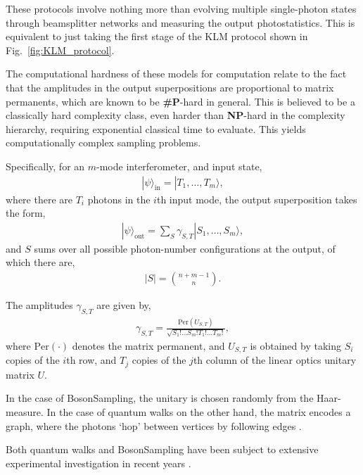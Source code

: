 \documentclass[aps,rmp,twocolumn,amsmath,amssymb,nofootinbib,superscriptaddress,longbibliography,floatfix]{revtex4-1}
\newcommand{\ket}[1]{|#1\rangle}
\begin{document}
These protocols involve nothing more than evolving multiple single-photon states through beamsplitter networks and measuring the output photostatistics. This is equivalent to just taking the first stage of the KLM protocol shown in Fig.~\ref{fig:KLM_protocol}.

The computational hardness of these models for computation relate to the fact that the amplitudes in the output superpositions are proportional to matrix permanents, which are known to be \textbf{\#P}-hard in general. This is believed to be a classically hard complexity class, even harder than \textbf{NP}-hard in the complexity hierarchy, requiring exponential classical time to evaluate. This yields computationally complex sampling problems.

Specifically, for an $m$-mode interferometer, and input state,
\begin{align}
\ket\psi_\mathrm{in} = \ket{T_1,\dots,T_m},
\end{align}
where there are $T_i$ photons in the $i$th input mode, the output superposition takes the form,
\begin{align}
\ket\psi_\mathrm{out} = \sum_S \gamma_{S,T} \ket{S_1,\dots,S_m},
\end{align}
and $S$ sums over all possible photon-number configurations at the output, of which there are,
\begin{align}
|S| = \binom{n+m-1}{n}.
\end{align}

The amplitudes $\gamma_{S,T}$ are given by,
\begin{align}
\gamma_{S,T} = \frac{\mathrm{Per}(U_{S,T})}{\sqrt{S_1!\dots S_m! T_1!\dots T_m!}},
\end{align}
where $\mathrm{Per}(\cdot)$ denotes the matrix permanent, and $U_{S,T}$ is obtained by taking $S_i$ copies of the $i$th row, and $T_j$ copies of the $j$th column of the linear optics unitary matrix $U$.

In the case of {\sc BosonSampling}, the unitary is chosen randomly from the Haar-measure. In the case of quantum walks on the other hand, the matrix encodes a graph, where the photons `hop' between vertices by following edges \cite{RohdeQWintro}.

Both quantum walks and {\sc BosonSampling} have been subject to extensive experimental investigation in recent years \cite{bib:PeruzzoQW, bib:Broome10, bib:Schreiber11b, bib:Owens11, bib:RohdeQWExp12, bib:Broome2012, bib:RohdeQWExp12, bib:Spring2, bib:Crespi3, bib:Tillmann4}.
\end{document}
